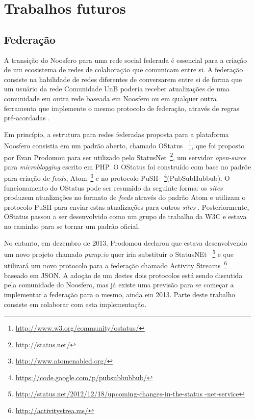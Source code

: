 \section{Trabalhos futuros}


\subsection{Federação}

A transição do Noosfero para uma rede social federada é essencial para a criação
de um ecosistema de redes de colaboração que comunicam entre si. A federação
consiste na habilidade de redes diferentes de conversarem entre si de forma que
um usuário da rede Comunidade UnB poderia receber atualizações de uma comunidade
em outra rede baseada em Noosfero ou em qualquer outra ferramenta que implemente
o mesmo protocolo de federação, através de regras pré-acordadas
\cite{prodomou2010}.

Em princípio, a estrutura para redes federadas proposta para a plataforma Noosfero
consistia em um padrão aberto, chamado OStatus
~\footnote{\url{http://www.w3.org/community/ostatus/}}, que foi proposto
por Evan Prodomou para ser utilizado pelo StatusNet~\footnote{\url{
http://status.net/}}, um servidor  \textit{open-surce} para
\textit{microblogging} escrito em PHP.
%
O OStatus foi construído com base no padrõe para criação de \textit{feeds},
Atom~\footnote{\url{http://www.atomenabled.org/}} e no protocolo PuSH
~\footnote{\url{https://code.google.com/p/pubsubhubbub/}}(PubSubHubbub).
O funcionamento do OStatus pode ser resumido da seguinte forma:
os \textit{sites} produzem atualizações no formato de \textit{feeds} através
do padrão Atom e utilizam o protocolo PuSH para enviar estas atualizações
para outros \textit{sites} \cite{OStatusBasics}.
%
Posteriormente, OStatus passou a ser desenvolvido como um grupo de trabalho
da W3C e estava no caminho para se tornar um padrão oficial. 

No entanto, em dezembro de 2013, Prodomou declarou que estava desenvolvendo
um novo projeto chamado \textit{pump.io} quer iria substituir o StatusNEt
~\footnote{\url{http://status.net/2012/12/18/upcoming-changes-in-the-status
-net-service}} e que utilizará um novo protocolo para a federação chamado
Activity Streams~\footnote{\url{http://activitystrea.ms/}} baseado em JSON.
A adoção de um destes dois protocolos está sendo discutida pela comunidade do
Noosfero, mas já existe uma previsão para se começar a implementar a federação
para o mesmo, ainda em 2013. Parte deste trabalho consiste em colaborar com esta
implementação.

